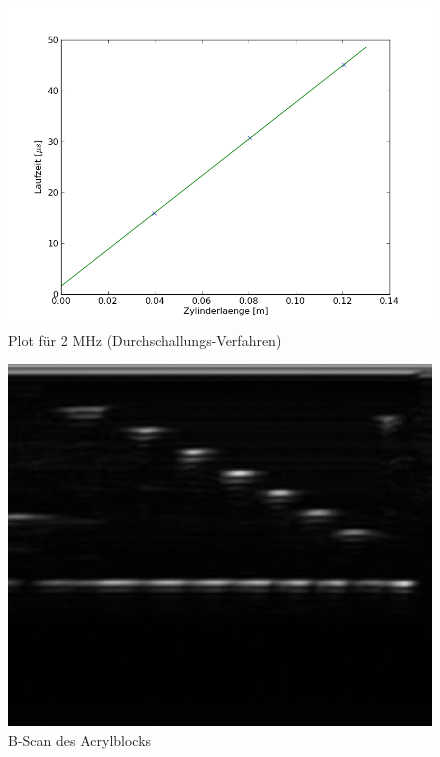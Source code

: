 \documentclass[11pt,ngerman,a4paper]{article}
\begin{document}
\newpage
\begin{figure}[h]
\includegraphics[width=12cm]{Fig3.png}
\caption{Plot für 2 MHz (Durchschallungs-Verfahren)}
\label{fig2}
\end{figure}
\newpage
\begin{figure}[h]
\includegraphics[width=12cm]{bscan1.jpg}
\caption{B-Scan des Acrylblocks}
\label{fig3}
\end{figure}
\newpage
\end{document}
